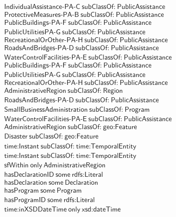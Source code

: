 \begin{align}
  \textsf{IndividualAssistance-PA-C}~\textsf{subClassOf:}~\textsf{PublicAssistance}\\
  \textsf{ProtectiveMeasures-PA-B}~\textsf{subClassOf:}~\textsf{PublicAssistance}\\
  \textsf{PublicBuildings-PA-F}~\textsf{subClassOf:}~\textsf{PublicAssistance}\\
  \textsf{PublicUtilitiesPA-G}~\textsf{subClassOf:}~\textsf{PublicAssistance}\\
  \textsf{RecreationalOrOther-PA-H}~\textsf{subClassOf:}~\textsf{PublicAssistance}\\
  \textsf{RoadsAndBridges-PA-D}~\textsf{subClassOf:}~\textsf{PublicAssistance}\\
  \textsf{WaterControlFacilities-PA-E}~\textsf{subClassOf:}~\textsf{PublicAssistance}\\
  \textsf{PublicBuildings-PA-F}~\textsf{subClassOf:}~\textsf{PublicAssistance}\\
  \textsf{PublicUtilitiesPA-G}~\textsf{subClassOf:}~\textsf{PublicAssistance}\\
  \textsf{RecreationalOrOther-PA-H}~\textsf{subClassOf:}~\textsf{PublicAssistance}\\
  \textsf{AdministrativeRegion}~\textsf{subClassOf:}~\textsf{Region}\\
  \textsf{RoadsAndBridges-PA-D}~\textsf{subClassOf:}~\textsf{PublicAssistance}\\
  \textsf{SmallBusinessAdministration}~\textsf{subClassOf:}~\textsf{Program}\\
  \textsf{WaterControlFacilities-PA-E}~\textsf{subClassOf:}~\textsf{PublicAssistance}\\
  \textsf{AdministrativeRegion}~\textsf{subClassOf:}~\textsf{geo:Feature}\\
  \textsf{Disaster}~\textsf{subClassOf:}~\textsf{geo:Feature}\\
  \textsf{time:Instant}~\textsf{subClassOf:}~\textsf{time:TemporalEntity}\\
  \textsf{time:Instant}~\textsf{subClassOf:}~\textsf{time:TemporalEntity}\\
  \textsf{sfWithin}~\textsf{only}~\textsf{AdministrativeRegion}\\
  \textsf{hasDeclarationID}~\textsf{some}~\textsf{rdfs:Literal}\\
  \textsf{hasDeclaration}~\textsf{some}~\textsf{Declaration}\\
  \textsf{hasProgram}~\textsf{some}~\textsf{Program}\\
  \textsf{hasProgramID}~\textsf{some}~\textsf{rdfs:Literal}\\
  \textsf{time:inXSDDateTime}~\textsf{only}~\textsf{xsd:dateTime}\end{align}


